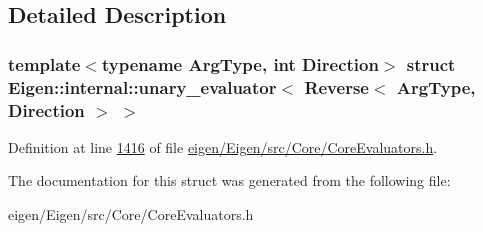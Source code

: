 \subsection{Detailed Description}
\subsubsection*{template$<$typename Arg\+Type, int Direction$>$\newline
struct Eigen\+::internal\+::unary\+\_\+evaluator$<$ Reverse$<$ Arg\+Type, Direction $>$ $>$}



Definition at line \hyperlink{eigen_2_eigen_2src_2_core_2_core_evaluators_8h_source_l01416}{1416} of file \hyperlink{eigen_2_eigen_2src_2_core_2_core_evaluators_8h_source}{eigen/\+Eigen/src/\+Core/\+Core\+Evaluators.\+h}.



The documentation for this struct was generated from the following file\+:\begin{DoxyCompactItemize}
\item 
eigen/\+Eigen/src/\+Core/\+Core\+Evaluators.\+h\end{DoxyCompactItemize}
